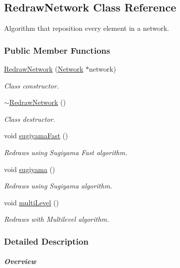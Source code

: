 \hypertarget{class_redraw_network}{}\subsection{Redraw\+Network Class Reference}
\label{class_redraw_network}


Algorithm that reposition every element in a network.  


\subsubsection*{Public Member Functions}
\begin{DoxyCompactItemize}
\item 
\hyperlink{class_redraw_network_a1fe3edb8c57780eb62f7de8f03dfeda3}{Redraw\+Network} (\hyperlink{class_network}{Network} $\ast$network)
\begin{DoxyCompactList}\small\item\em Class constructor. \end{DoxyCompactList}\item 
\hyperlink{class_redraw_network_ac7b5f7fdb2b88e7d8bb580834e93b1e8}{$\sim$\+Redraw\+Network} ()
\begin{DoxyCompactList}\small\item\em Class destructor. \end{DoxyCompactList}\item 
void \hyperlink{class_redraw_network_a94d53ddf8ee00c4ef6d56bb988333103}{sugiyama\+Fast} ()
\begin{DoxyCompactList}\small\item\em Redraws using Sugiyama Fast algorithm. \end{DoxyCompactList}\item 
void \hyperlink{class_redraw_network_aee0ae606982145e66bba825421d610f8}{sugiyama} ()
\begin{DoxyCompactList}\small\item\em Redraws using Sugiyama algorithm. \end{DoxyCompactList}\item 
void \hyperlink{class_redraw_network_a56a92ad06ae0198ee60160aa66aa0ce1}{multi\+Level} ()
\begin{DoxyCompactList}\small\item\em Redraws with Multilevel algorithm. \end{DoxyCompactList}\end{DoxyCompactItemize}


\subsubsection{Detailed Description}
\subparagraph*{Overview}

